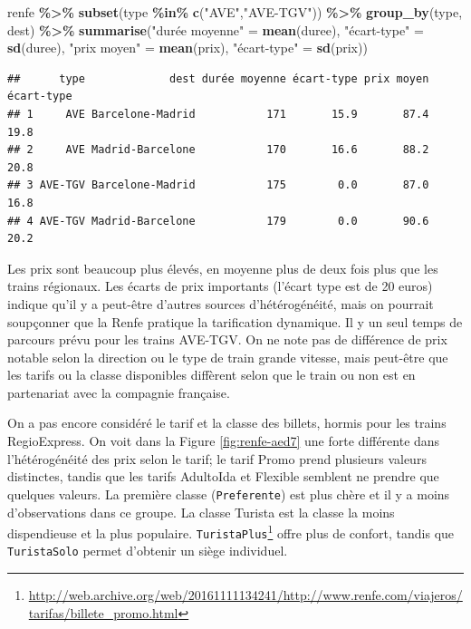 \documentclass[
  11pt,
  letterpaper,
]{book}
\newenvironment{Shaded}{\begin{snugshade}}{\end{snugshade}}
\newcommand{\KeywordTok}[1]{\textcolor[rgb]{0.13,0.29,0.53}{\textbf{#1}}}
\newcommand{\NormalTok}[1]{#1}
\newcommand{\OperatorTok}[1]{\textcolor[rgb]{0.81,0.36,0.00}{\textbf{#1}}}
\newcommand{\StringTok}[1]{\textcolor[rgb]{0.31,0.60,0.02}{#1}}
\renewcommand{\href}[2]{#2\footnote{\url{#1}}}
\theoremstyle{definition}
\theoremstyle{definition}
\theoremstyle{definition}
\theoremstyle{remark}
\begin{document}
\begin{Shaded}
\begin{Highlighting}[]
\NormalTok{renfe }\OperatorTok{\%\textgreater{}\%}\StringTok{ }
\StringTok{  }\KeywordTok{subset}\NormalTok{(type }\OperatorTok{\%in\%}\StringTok{ }\KeywordTok{c}\NormalTok{(}\StringTok{"AVE"}\NormalTok{,}\StringTok{"AVE{-}TGV"}\NormalTok{)) }\OperatorTok{\%\textgreater{}\%}\StringTok{ }
\StringTok{  }\KeywordTok{group\_by}\NormalTok{(type, dest) }\OperatorTok{\%\textgreater{}\%}\StringTok{ }
\StringTok{  }\KeywordTok{summarise}\NormalTok{(}\StringTok{"durée moyenne"}\NormalTok{ =}\StringTok{ }\KeywordTok{mean}\NormalTok{(duree), }
            \StringTok{"écart{-}type"}\NormalTok{ =}\StringTok{ }\KeywordTok{sd}\NormalTok{(duree),}
            \StringTok{"prix moyen"}\NormalTok{ =}\StringTok{ }\KeywordTok{mean}\NormalTok{(prix),}
            \StringTok{"écart{-}type"}\NormalTok{ =}\StringTok{ }\KeywordTok{sd}\NormalTok{(prix))}
\end{Highlighting}
\end{Shaded}

\begin{verbatim}
##      type             dest durée moyenne écart-type prix moyen écart-type
## 1     AVE Barcelone-Madrid           171       15.9       87.4       19.8
## 2     AVE Madrid-Barcelone           170       16.6       88.2       20.8
## 3 AVE-TGV Barcelone-Madrid           175        0.0       87.0       16.8
## 4 AVE-TGV Madrid-Barcelone           179        0.0       90.6       20.2
\end{verbatim}

Les prix sont beaucoup plus élevés, en moyenne plus de deux fois plus que les trains régionaux. Les écarts de prix importants (l'écart type est de 20 euros) indique qu'il y a peut-être d'autres sources d'hétérogénéité, mais on pourrait soupçonner que la Renfe pratique la tarification dynamique. Il y un seul temps de parcours prévu pour les trains AVE-TGV. On ne note pas de différence de prix notable selon la direction ou le type de train grande vitesse, mais peut-être que les tarifs ou la classe disponibles diffèrent selon que le train ou non est en partenariat avec la compagnie française.

On a pas encore considéré le tarif et la classe des billets, hormis pour les trains RegioExpress. On voit dans la Figure \ref{fig:renfe-aed7} une forte différente dans l'hétérogénéité des prix selon le tarif; le tarif Promo prend plusieurs valeurs distinctes, tandis que les tarifs AdultoIda et Flexible semblent ne prendre que quelques valeurs. La première classe (\texttt{Preferente}) est plus chère et il y a moins d'observations dans ce groupe. La classe Turista est la classe la moins dispendieuse et la plus populaire. \href{http://web.archive.org/web/20161111134241/http://www.renfe.com/viajeros/tarifas/billete_promo.html}{\texttt{TuristaPlus}} offre plus de confort, tandis que \texttt{TuristaSolo} permet d'obtenir un siège individuel.
\end{document}
